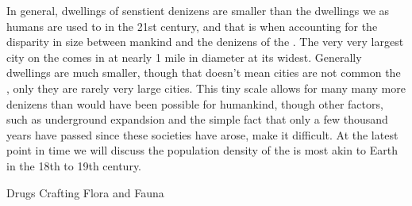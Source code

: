 \documentclass[twoside, 12pt, letterpaper]{report}\usepackage[]{graphicx}\usepackage[]{color}
\begin{document}
\begin{multicols*}{2}
In general, dwellings of senstient denizens are smaller than the dwellings we as humans are used to in the 21st century, and that is when accounting for the disparity in size between mankind and the denizens of the \mw. The very very largest city on the \mw comes in at nearly 1 mile in diameter at its widest. Generally dwellings are much smaller, though that doesn't mean cities are not common \ooi the \mw, only they are rarely very large cities. This tiny scale allows for many many more denizens than would have been possible for humankind, though other factors, such as underground expandsion and the simple fact that only a few thousand years have passed since these societies have arose, make it difficult. At the latest point in time we will discuss the population density of the \mw is most akin to Earth in the 18th to 19th century. 
\end{multicols*}



\begin{multicols*}{2}
\end{multicols*}


\begin{multicols*}{2}
\end{multicols*}

\begin{multicols*}{2}
\end{multicols*}


\begin{multicols*}{2}
\end{multicols*}

\begin{multicols*}{2}
Drugs
Crafting
Flora and Fauna

\end{multicols*}

\end{document}
